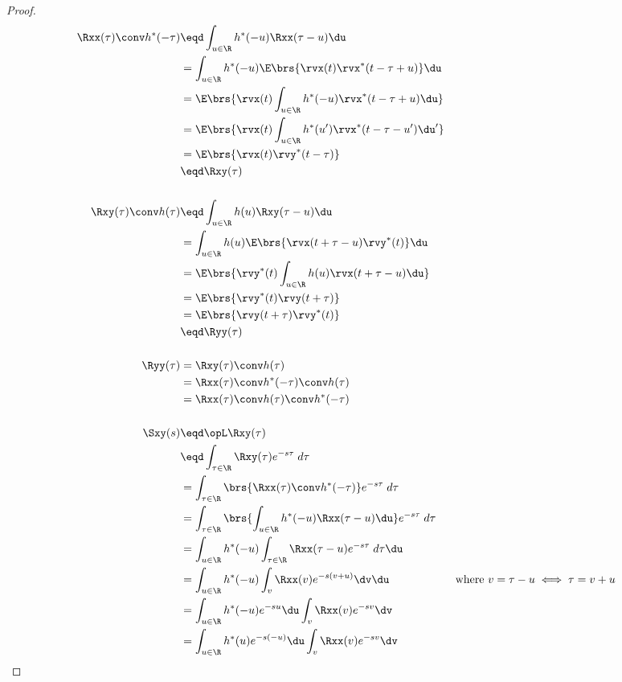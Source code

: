 \begin{proof}
\begin{align*}
   \Rxx(\tau) \conv h^\ast(-\tau)
     &\eqd \int_{u\in\R}h^\ast(-u) \Rxx(\tau-u)\du
   \\&=    \int_{u\in\R}h^\ast(-u) \E\brs{\rvx(t) \rvx^\ast(t-\tau+u) } \du
   \\&=    \E\brs{\rvx(t) \int_{u\in\R}h^\ast(-u)  \rvx^\ast(t-\tau+u) \du   }
   \\&=    \E\brs{\rvx(t) \int_{u\in\R}h^\ast(u^\prime)  \rvx^\ast(t-\tau-u^\prime) \du^\prime   }
   \\&=    \E\brs{\rvx(t) \rvy^\ast(t-\tau)  }
   \\&\eqd \Rxy(\tau)
\\
\\
   \Rxy(\tau) \conv h(\tau)
     &\eqd \int_{u\in\R}h(u) \Rxy(\tau-u)\du
   \\&=    \int_{u\in\R}h(u) \E\brs{\rvx(t+\tau-u) \rvy^\ast(t) } \du
   \\&=    \E\brs{\rvy^\ast(t) \int_{u\in\R}h(u) \rvx(t+\tau-u)  \du }
   \\&=    \E\brs{\rvy^\ast(t) \rvy(t+\tau) }
   \\&=    \E\brs{ \rvy(t+\tau) \rvy^\ast(t)}
   \\&\eqd \Ryy(\tau)
\\
\\
   \Ryy(\tau)
     &= \Rxy(\tau) \conv h(\tau)
   \\&= \Rxx(\tau) \conv h^\ast(-\tau) \conv h(\tau)
   \\&= \Rxx(\tau) \conv h(\tau)  \conv h^\ast(-\tau)
\\
\\
  \Sxy(s)
     &\eqd \opL \Rxy(\tau)
   \\&\eqd \int_{\tau\in\R}\Rxy(\tau) e^{-s\tau} \; d\tau
   \\&=    \int_{\tau\in\R}\brs{ \Rxx(\tau) \conv h^\ast(-\tau) } e^{-s\tau} \; d\tau
   \\&=    \int_{\tau\in\R}\brs{ \int_{u\in\R}h^\ast(-u) \Rxx(\tau-u)\du } e^{-s\tau} \; d\tau
   \\&=    \int_{u\in\R}h^\ast(-u) \int_{\tau\in\R}\Rxx(\tau-u)e^{-s\tau} \; d\tau\du
   \\&=    \int_{u\in\R}h^\ast(-u) \int_v \Rxx(v)e^{-s(v+u)} \dv \du
     && \text{where $v=\tau-u\iff \tau=v+u$}
   \\&=    \int_{u\in\R}h^\ast(-u) e^{-su} \du \int_v \Rxx(v)e^{-sv} \dv
   \\&=    \int_{u\in\R}h^\ast(u) e^{-s(-u)} \du \int_v \Rxx(v)e^{-sv} \dv

\end{align*}
\end{proof}

